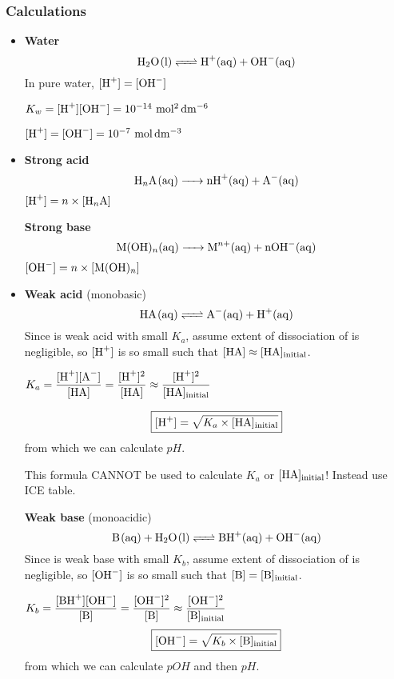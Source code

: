 \subsubsection{Calculations}
\begin{itemize}
\item \textbf{Water}
\[ \ce{H2O(l) <=> H+(aq) + OH-(aq)} \]
In pure water, $[\ce{H+}]=[\ce{OH-}]$

$K_w=[\ce{H+}][\ce{OH-}]=10^{-14}\,\unit{mol^2\,dm^{-6}}$

$[\ce{H+}]=[\ce{OH-}]=10^{-7}\,\unit{mol\,dm^{-3}}$

\item \textbf{Strong acid}
\[ \ce{H_nA(aq) -> nH+(aq) + A-(aq)} \]
$[\ce{H+}]=n\times[\ce{H_nA}]$

\vspace{5mm}

\textbf{Strong base}
\[ \ce{M(OH)_n(aq) -> M^{n+}(aq) + nOH-(aq)} \]
$[\ce{OH-}]=n\times[\ce{M(OH)_n}]$

\item \textbf{Weak acid} (monobasic)
\[ \ce{HA(aq) <=> A-(aq) + H+(aq)} \]
Since  is weak acid with small $K_a$, assume extent of dissociation of  is negligible, so $[\ce{H+}]$ is so small such that $[\ce{HA}]\approx[\ce{HA}]_\text{initial}$.

$\displaystyle K_a=\frac{[\ce{H+}][\ce{A-}]}{[\ce{HA}]}=\frac{[\ce{H+}]^2}{[\ce{HA}]}\approx\frac{[\ce{H+}]^2}{[\ce{HA}]_\text{initial}}$

\[ \boxed{[\ce{H+}]=\sqrt{K_a\times[\ce{HA}]_\text{initial}}} \]
from which we can calculate $pH$.

\begin{remark}
This formula CANNOT be used to calculate $K_a$ or $[\ce{HA}]_\text{initial}$! Instead use ICE table.
\end{remark}

\vspace{5mm}

\textbf{Weak base} (monoacidic)
\[ \ce{B(aq) + H2O(l) <=> BH+(aq) + OH-(aq)} \]
Since  is weak base with small $K_b$, assume extent of dissociation of  is negligible, so $[\ce{OH-}]$ is so small such that $[\ce{B}]=[\ce{B}]_\text{initial}$.

$\displaystyle K_b=\frac{[\ce{BH+}][\ce{OH-}]}{[\ce{B}]}=\frac{[\ce{OH-}]^2}{[\ce{B}]}\approx\frac{[\ce{OH-}]^2}{[\ce{B}]_\text{initial}}$
\[ \boxed{[\ce{OH-}]=\sqrt{K_b\times[\ce{B}]_\text{initial}}} \]
from which we can calculate $pOH$ and then $pH$.


\end{itemize}
